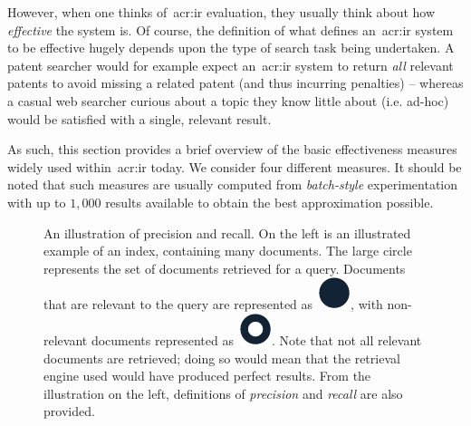 However, when one thinks of~\gls{acr:ir} evaluation, they usually think about how \emph{effective} the system is. Of course, the definition of what defines an~\gls{acr:ir} system to be effective hugely depends upon the type of search task being undertaken. A patent searcher would for example expect an~\gls{acr:ir} system to return \emph{all} relevant patents to avoid missing a related patent (and thus incurring penalties) -- whereas a casual web searcher curious about a topic they know little about (i.e. ad-hoc) would be satisfied with a single, relevant result.

As such, this section provides a brief overview of the basic effectiveness measures widely used within~\gls{acr:ir} today. We consider four different measures. It should be noted that such measures are usually computed from \emph{batch-style} experimentation with up to $1,000$ results available to obtain the best approximation possible.

\begin{figure}[t!]
    \centering
    \caption[Precision and recall]{An illustration of precision and recall. On the left is an illustrated example of an index, containing many documents. The large circle represents the set of documents retrieved for a query. Documents that are relevant to the query are represented as~\includegraphics[height=\fontcharht\font`\d]{figures/ch2-pr-r.pdf}, with non-relevant documents represented as~\includegraphics[height=\fontcharht\font`\d]{figures/ch2-pr-nr.pdf}. Note that not all relevant documents are retrieved; doing so would mean that the retrieval engine used would have produced perfect results. From the illustration on the left, definitions of \emph{precision} and \emph{recall} are also provided.}
    \label{fig:pr}
\end{figure}


